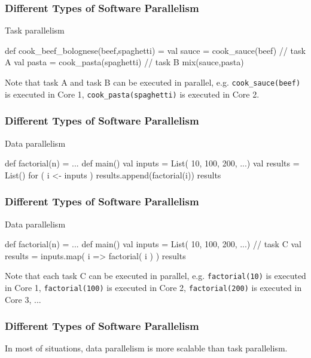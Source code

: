 \documentclass{beamer}
\newcommand{\beb}{\begin{exampleblock}}
\newcommand{\eeb}{\end{exampleblock}}
\begin{document}
\begin{frame}[fragile]
\frametitle{Different Types of Software Parallelism}

\beb{Task parallelism}
  \begin{code}
   def cook_beef_bolognese(beef,spaghetti) = {
     val sauce = cook_sauce(beef) // task A
     val pasta = cook_pasta(spaghetti) //  task B
     mix(sauce,pasta)
   }
   \end{code}
\eeb
Note that task A and task B can be executed in parallel, e.g. 
{\tt cook\_sauce(beef)} is executed in Core 1, 
{\tt cook\_pasta(spaghetti)} is executed in Core 2.
\end{frame}


\begin{frame}[fragile]
\frametitle{Different Types of Software Parallelism}

\beb{Data parallelism}
  \begin{code}
   def factorial(n) = ... 
   def main() {
      val inputs = List( 10, 100, 200, ...) 
      val results = List()
      for ( i <- inputs ) 
      { 
          results.append(factorial(i))
      }
      results
   }
   \end{code}
\eeb

\end{frame}



\begin{frame}[fragile]
\frametitle{Different Types of Software Parallelism}

\beb{Data parallelism}
  \begin{code}
   def factorial(n) = ... 
   def main() {
      val inputs = List( 10, 100, 200, ...) 
     // task C
      val results = inputs.map( i => factorial( i ) ) 
      results
   }
   \end{code}
\eeb
Note that each task C can be executed in parallel, e.g.
{\tt factorial(10)} is executed in Core 1,
{\tt factorial(100)} is executed in Core 2,
{\tt factorial(200)} is executed in Core 3, 
...
\end{frame}


\begin{frame}[fragile]
\frametitle{Different Types of Software Parallelism}

In most of situations, data parallelism is more scalable than task parallelism.
\end{frame}
\end{document}

